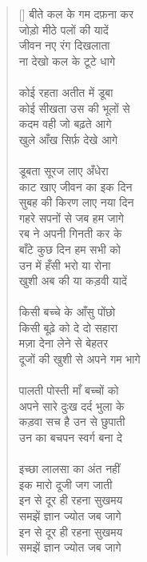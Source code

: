 \begin{verse}[\versewidth]\texthindi{
बीते कल के गम दफ़ना कर\\
जोड़ो मीठे पलों की यादें\\
जीवन नए रंग दिखलाता\\
ना देखो कल के टूटे धागे\\
\\
कोई रहता अतीत में डूबा\\
कोई सीखता उस की भूलों से\\
कदम वही जो बढ़ते आगे\\
खुले आँख सिर्फ़ देखे आगे\\
\\
डूबता सूरज लाए अँधेरा\\
काट खाए जीवन का इक दिन\\
सुबह की किरण लाए नया दिन\\
गहरे सपनों से जब हम जागे\\
रब ने अपनी गिनती कर के\\
बाँटे कुछ दिन हम सभी को\\
उन में हँसी भरो या रोना\\
खुशी अब की या कड़वी यादें\\
\\
किसी बच्चे के आँसु पोंछो\\
किसी बूढ़े को दे दो सहारा\\
मज़ा देना लेने से बेहतर\\
दूजों की खुशी से अपने गम भागे\\
\\
पालती पोस्ती माँ बच्चों को\\
 अपने सारे दुःख दर्द भुला के\\
कड़वा सच है उन से छुपाती\\
उन का बचपन स्वर्ग बना दे\\
\\
इच्छा लालसा का अंत नहीं\\
इक मारो दूजी जग जाती\\
इन से दूर ही रहना सुखमय\\
समझें ज्ञान ज्योत जब जागे\\
इन से दूर ही रहना सुखमय\\
समझें ज्ञान ज्योत जब जागे
}
\end{verse}

